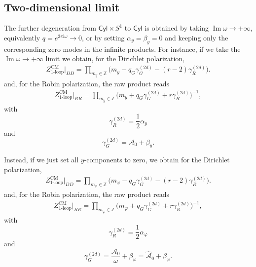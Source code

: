 \documentclass[11pt,a4paper]{article}
\numberwithin{equation}{section}
\theoremstyle{plain}
\theoremstyle{definition}
\theoremstyle{remark}
\newcommand{\ii}{\mathrm{i}}
\newcommand{\cyl}{\mathsf{Cyl}}
\begin{document}
\subsection{Two-dimensional limit}

The further degeneration from $\cyl \times S^1$ to $\cyl$ is obtained by taking $\operatorname{Im}\omega\to+\infty$, equivalently $q=e^{2\pi\ii\omega}\to0$, or by setting $\alpha_y=\beta_y=0$ and keeping only the corresponding zero modes in the infinite products. For instance, if we take the $\operatorname{Im}\omega\to+\infty$ limit we obtain, for the Dirichlet polarization,
\begin{align}
Z^{\mathrm{CM}}_{\mathrm{1\mbox{-}loop}}\big|_{DD}  =
\prod_{m_y\in\mathbb{Z}}
\Big( m_y-q_G\gamma_G^{(2d)}-(r-2)\gamma_R^{(2d)}\Big).
\label{eq:ZrawD2d}
\end{align}
and,  for the Robin polarization,   the raw product reads
\begin{align}
Z^{\mathrm{CM}}_{\mathrm{1\mbox{-}loop}}\big|_{RR} 
 =
\prod_{m_y\in\mathbb{Z}}
\Big( m_y+q_G\gamma_G^{(2d)}+r\gamma_R^{(2d)}\Big)^{-1} ,
\label{eq:ZrawR2d}
\end{align}
with
\begin{equation}
    \gamma_R^{(2d)} = \frac{1}{2} \alpha_y 
\end{equation}
and
\begin{equation}
    \gamma_G^{(2d)} = \mathcal A_0 + \beta_y .
\end{equation}

Instead, if we just set all $y$-components to zero, we obtain for the Dirichlet polarization,  
\begin{align}
Z^{\mathrm{CM}}_{\mathrm{1\mbox{-}loop}}\big|_{DD}  =
\prod_{m_\varphi \in\mathbb{Z}}
\Big( m_\varphi -q_G\gamma_G^{(2d)}-(r-2)\gamma_R^{(2d)}\Big).
\label{eq:ZrawD2dbis}
\end{align}
and,  for the Robin polarization,   the raw product reads
\begin{align}
Z^{\mathrm{CM}}_{\mathrm{1\mbox{-}loop}}\big|_{RR} 
 =
\prod_{m_\varphi\in\mathbb{Z}}
\Big( m_\varphi +q_G\gamma_G^{(2d)}+r\gamma_R^{(2d)}\Big)^{-1} ,
\label{eq:ZrawR2dbis}
\end{align}
with
\begin{equation}
    \gamma_R^{(2d)} = \frac{1}{2} \alpha_\varphi 
\end{equation}
and
\begin{equation}
    \gamma_G^{(2d)} = \frac{\mathcal A_0}{\omega} + \beta_\varphi = \widehat{\mathcal A}_0 + \beta_\varphi .
\end{equation}
\end{document}
